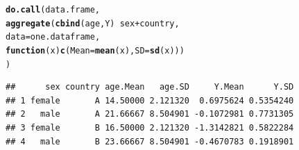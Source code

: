 \documentclass{config/apuntes}\usepackage[]{graphicx}\usepackage[]{xcolor}
\makeatletter
\newcommand{\hlopt}[1]{\textcolor[rgb]{0,0,0}{#1}}%
\newcommand{\hldef}[1]{\textcolor[rgb]{0.345,0.345,0.345}{#1}}%
\newcommand{\hlkwa}[1]{\textcolor[rgb]{0.161,0.373,0.58}{\textbf{#1}}}%
\newcommand{\hlkwc}[1]{\textcolor[rgb]{0.333,0.667,0.333}{#1}}%
\newcommand{\hlkwd}[1]{\textcolor[rgb]{0.737,0.353,0.396}{\textbf{#1}}}%
\newenvironment{kframe}{%
 \def\at@end@of@kframe{}%
 \ifinner\ifhmode%
  \def\at@end@of@kframe{\end{minipage}}%
  \begin{minipage}{\columnwidth}%
 \fi\fi%
 \def\FrameCommand##1{\hskip\@totalleftmargin \hskip-\fboxsep
 \colorbox{shadecolor}{##1}\hskip-\fboxsep
     \hskip-\linewidth \hskip-\@totalleftmargin \hskip\columnwidth}%
 \MakeFramed {\advance\hsize-\width
   \@totalleftmargin\z@ \linewidth\hsize
   \@setminipage}}%
 {\par\unskip\endMakeFramed%
 \at@end@of@kframe}
\newenvironment{knitrout}{}{} %
\makeatother
\begin{document}
\begin{knitrout}
\color{fgcolor}\begin{kframe}
\begin{alltt}
\hlkwd{do.call}\hldef{(data.frame,}
        \hlkwd{aggregate}\hldef{(}\hlkwd{cbind}\hldef{(age, Y)} \hlopt{~} \hldef{sex} \hlopt{+} \hldef{country,}
                  \hlkwc{data} \hldef{= one.dataframe,}
                  \hlkwa{function}\hldef{(}\hlkwc{x}\hldef{)} \hlkwd{c}\hldef{(}\hlkwc{Mean} \hldef{=} \hlkwd{mean}\hldef{(x),} \hlkwc{SD} \hldef{=} \hlkwd{sd}\hldef{(x)))}
        \hldef{)}
\end{alltt}
\begin{verbatim}
##      sex country age.Mean   age.SD     Y.Mean      Y.SD
## 1 female       A 14.50000 2.121320  0.6975624 0.5354240
## 2   male       A 21.66667 8.504901 -0.1072981 0.7731305
## 3 female       B 16.50000 2.121320 -1.3142821 0.5822284
## 4   male       B 23.66667 8.504901 -0.4670783 0.1918901
\end{verbatim}
\end{kframe}
\end{knitrout}
\end{document}
